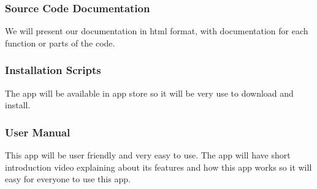 \subsubsection{Source Code Documentation}
We will present our documentation in html format, with documentation for each function or parts of
the code.
\subsubsection{Installation Scripts}
The app will be available in app store so it will be very use to download and install.
\subsubsection{User Manual}
This app will be user friendly and very easy to use. The app will have short introduction video explaining 
about its features and how this app works so it will easy for everyone to use this app.